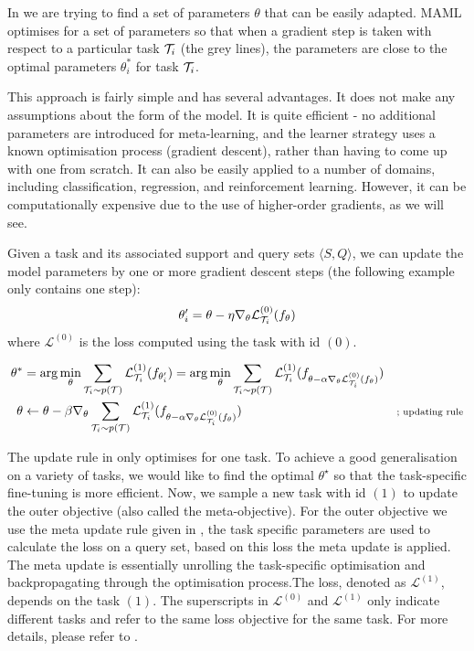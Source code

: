 In  we are trying to find a set of parameters $\theta$ that can be easily adapted. MAML optimises for a set of parameters so that when a gradient step is taken with respect to a particular task $\mathcal{T}_i $ (the grey lines), the parameters are close to the optimal parameters $\theta^*_i$ for task $\mathcal{T}_i$.

This approach is fairly simple and has several advantages. It does not make any assumptions about the form of the model. It is quite efficient - no additional parameters are introduced for meta-learning, and the learner strategy uses a known optimisation process (gradient descent), rather than having to come up with one from scratch. It can also be easily applied to a number of domains, including classification, regression, and reinforcement learning. However, it can be computationally expensive due to the use of higher-order gradients, as we will see.

Given a task and its associated support and query sets $\langle S, Q \rangle$, we can update the model parameters by one or more gradient descent steps (the following example only contains one step):
\begin{equation}
    \theta^\prime_i = \theta - \eta \nabla_\theta\mathcal{L}^{(0)}_{\mathcal{T}_i}(f_\theta)
    \label{eqn:one-task-maml}
\end{equation}
where $\mathcal{L}^{(0)}$ is the loss computed using the task with id $(0)$.

\begin{equation}
    \begin{aligned}
            \theta^* 
            &= \arg\min_\theta \sum_{\mathcal{T}_i \sim p(\mathcal{T})} \mathcal{L}_{\mathcal{T}_i}^{(1)} (f_{\theta'_i}) = \arg\min_\theta \sum_{\mathcal{T}_i \sim p(\mathcal{T})} \mathcal{L}_{\mathcal{T}_i}^{(1)} (f_{\theta - \alpha\nabla_\theta \mathcal{L}_{\mathcal{T}_i}^{(0)}(f_\theta)}) & \\
            \theta &\leftarrow \theta - \beta \nabla_{\theta} \sum_{\mathcal{T}_i \sim p(\mathcal{T})} \mathcal{L}_{\mathcal{T}_i}^{(1)} (f_{\theta - \alpha\nabla_\theta \mathcal{L}_{\mathcal{T}_i}^{(0)}(f_\theta)}) & \scriptstyle{\text{; updating rule}}
    \end{aligned}
    \label{eqn:maml-update-rule}
\end{equation}

The update rule in  only optimises for one task. To achieve a good generalisation on a variety of tasks, we would like to find the optimal $\theta^\star$ so that the task-specific fine-tuning is more efficient.
Now, we sample a new task with id $(1)$ to update the outer objective (also called the meta-objective).
For the outer objective we use the meta update rule given in , the task specific parameters are used to calculate the loss on a query set, based on this loss the meta update is applied. The meta update is essentially unrolling the task-specific optimisation and backpropagating through the optimisation process.The loss, denoted as $\mathcal{L}^{(1)}$, depends on the task $(1)$. The superscripts in $\mathcal{L}^{(0)}$ and $\mathcal{L}^{(1)}$ only indicate different tasks and refer to the same loss objective for the same task.
For more details, please refer to \parencite{Finn2017Model-agnosticNetworks}.


